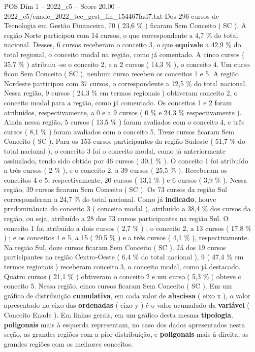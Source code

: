 \begin{textsample}{POS Dim 1 – 2022\_c5 – Score 20.00 – 2022\_c5/enade\_2022\_tec\_gest\_fin\_154467fad7.txt}
Dos 296 cursos de Tecnologia em Gestão Financeira, 70 ( 23,6 \% ) ficaram Sem Conceito ( SC ).
A região Norte participou com 14 cursos, o que correspondente a 4,7 \% do total nacional.
Desses, 6 cursos receberam o conceito 3, o que \textbf{equivale} a 42,9 \% do total regional, o conceito modal na região, como já comentado.
A cinco cursos ( 35,7 \% ) atribuiu -se o conceito 2, e a 2 cursos ( 14,3 \% ), o conceito 4.
Um curso ficou Sem Conceito ( SC ), nenhum curso recebeu os conceitos 1 e 5.
A região Nordeste participou com 37 cursos, o correspondente a 12,5 \% do total nacional.
Nessa região, 9 cursos ( 24,3 \% em termos regionais ) obtiveram conceito 2, o conceito modal para a região, como já comentado.
Os conceitos 1 e 2 foram atribuídos, respectivamente, a 0 e a 9 cursos ( 0 \% e 24,3 \% respectivamente ).
Ainda nessa região, 5 cursos ( 13,5 \% ) foram avaliados com o conceito 4, e três cursos ( 8,1 \% ) foram avaliados com o conceito 5.
Treze cursos ficaram Sem Conceito ( SC ).
Para os 153 cursos participantes da região Sudeste ( 51,7 \% do total nacional ), o conceito 3 foi o conceito modal, como já anteriormente assinalado, tendo sido obtido por 46 cursos ( 30,1 \% ).
O conceito 1 foi atribuído a três cursos ( 2 \% ), e o conceito 2, a 39 cursos ( 25,5 \% ).
Receberam os conceitos 4 e 5, respectivamente, 20 cursos ( 13,1 \% ) e 6 cursos ( 3,9 \% ).
Nessa região, 39 cursos ficaram Sem Conceito ( SC ).
Os 73 cursos da região Sul corresponderam a 24,7 \% do total nacional.
Como já \textbf{indicado}, houve predominância do conceito 3 ( conceito modal ), atribuído a 38,4 \% dos cursos da região, ou seja, atribuído a 28 dos 73 cursos participantes na região Sul.
O conceito 1 foi atribuído a dois cursos ( 2,7 \% ) ; o conceito 2, a 13 cursos ( 17,8 \% ) ; e os conceitos 4 e 5, a 15 ( 20,5 \% ) e a três cursos ( 4,1 \% ), respectivamente.
Na região Sul, doze cursos ficaram Sem Conceito ( SC ).
Já dos 19 cursos participantes na região Centro-Oeste ( 6,4 \% do total nacional ), 9 ( 47,4 \% em termos regionais ) receberam conceito 3, o conceito modal, como já destacado.
Quatro cursos ( 21,1 \% ) obtiveram o conceito 2 e um curso ( 5,3 \% ) obteve o conceito 5.
Nessa região, cinco cursos ficaram Sem Conceito ( SC ).
Em um gráfico de distribuição \textbf{cumulativa}, em cada valor de \textbf{abscissa} ( eixo x ), o valor apresentado no eixo das \textbf{ordenadas} ( eixo y ) é o valor acumulado da \textbf{variável} ( Conceito Enade ).
Em linhas gerais, em um gráfico desta mesma \textbf{tipologia}, \textbf{poligonais} mais à esquerda representam, no caso dos dados apresentados nesta seção, as grandes regiões com a pior distribuição, e \textbf{poligonais} mais à direita, as grandes regiões com os melhores conceitos.

\end{textsample}
